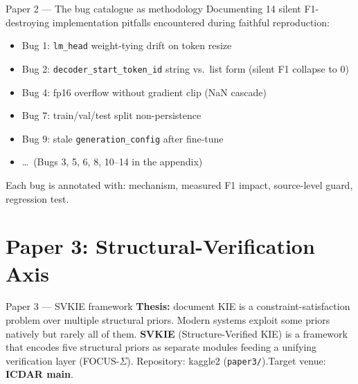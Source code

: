 \documentclass{beamer}
\begin{document}
\begin{frame}{Paper 2 --- The bug catalogue as methodology}
  Documenting 14 silent F1-destroying implementation pitfalls
  encountered during faithful reproduction:
  \begin{itemize}
    \item Bug 1: \texttt{lm\_head} weight-tying drift on token resize
    \item Bug 2: \texttt{decoder\_start\_token\_id} string vs.\ list
          form (silent F1 collapse to 0)
    \item Bug 4: fp16 overflow without gradient clip (NaN cascade)
    \item Bug 7: train/val/test split non-persistence
    \item Bug 9: stale \texttt{generation\_config} after fine-tune
    \item \dots\ (Bugs 3, 5, 6, 8, 10--14 in the appendix)
  \end{itemize}
  Each bug is annotated with: mechanism, measured F1 impact,
  source-level guard, regression test.
\end{frame}

\section{Paper 3: Structural-Verification Axis}
\begin{frame}{Paper 3 --- SVKIE framework}
  \textbf{Thesis:} document KIE is a constraint-satisfaction problem
  over multiple structural priors.  Modern systems exploit some priors
  natively but rarely all of them.
  \vspace{0.5em}
  \textbf{SVKIE} (Structure-Verified KIE) is a framework that encodes
  five structural priors as separate modules feeding a unifying
  verification layer (FOCUS-$\Sigma$).
  \vspace{0.5em}
  Repository: kaggle2 (\texttt{paper3/}).\quad Target venue: \textbf{ICDAR main}.
\end{frame}
\end{document}
